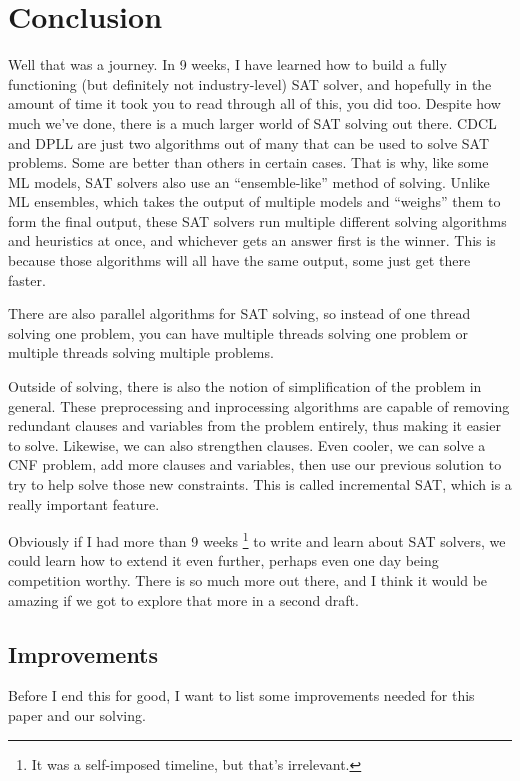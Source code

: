 \chapter{Conclusion}

Well that was a journey. In 9 weeks, I have learned how to build a fully functioning 
(but definitely not industry-level) SAT solver, and hopefully in the amount of time it 
took you to read through all of this, you did too. Despite how much we've done, there is 
a much larger world of SAT solving out there. CDCL and DPLL are just two algorithms out 
of many that can be used to solve SAT problems. Some are better than others in certain 
cases. That is why, like some ML models, SAT solvers also use an ``ensemble-like'' method 
of solving. Unlike ML ensembles, which takes the output of multiple models and ``weighs''
them to form the final output, these SAT solvers run multiple different solving 
algorithms and heuristics at once, and whichever gets an answer first is the winner. 
This is because those algorithms will all have the same output, some just get there 
faster.

There are also parallel algorithms for SAT solving, so instead of one thread solving 
one problem, you can have multiple threads solving one problem or multiple threads solving 
multiple problems. 

Outside of solving, there is also the notion of simplification of the problem in general. 
These preprocessing and inprocessing algorithms are capable of removing redundant clauses 
and variables from the problem entirely, thus making it easier to solve. Likewise, we can 
also strengthen clauses. Even cooler, we can solve a CNF problem, add more clauses and variables,
then use our previous solution to try to help solve those new constraints. This is called 
incremental SAT, which is a really important feature.

Obviously if I had more than 9 weeks
\footnote{It was a self-imposed timeline, but that's irrelevant.}
to write and learn about SAT solvers, we could learn how to extend it even further, 
perhaps even one day being competition worthy. There is so much more out there, and I 
think it would be amazing if we got to explore that more in a second draft.

\section{Improvements}

Before I end this for good, I want to list some improvements needed for this paper
and our solving.

